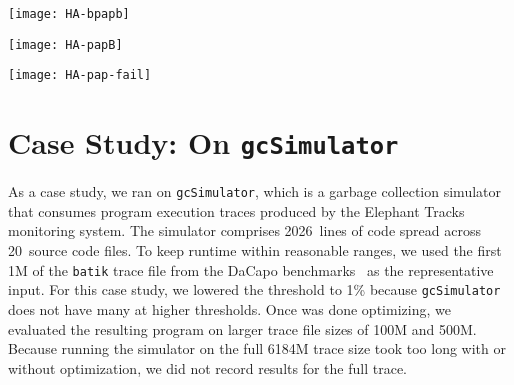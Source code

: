 \begin{figure*}
\texttt{[image: HA-bpapb]}
\label{fig:2-bangs-52-HA}
\end{figure*}

\begin{figure*}
\texttt{[image: HA-papB]}
\label{fig:2-ratio-52-HA}
\end{figure*}


\begin{figure*}
\texttt{[image: HA-pap-fail]}
\label{fig:2-failures-HA}
\end{figure*}


\section{Case Study: \At{} On \texttt{gcSimulator}}
As a case study, we ran \At{} on \texttt{gcSimulator}, which is a
garbage collection simulator that consumes program execution traces
produced by the Elephant Tracks~\cite{Ricci13} monitoring system.  The
simulator comprises 2026~lines of code spread across 20~source code
files. To keep \Ao{} runtime within reasonable ranges, we used the
first 1M of the \texttt{batik} trace file from the DaCapo
benchmarks~\cite{Blackburn06} as the representative input.  For this
case study, we lowered the \absim{} threshold to 1\%
because \texttt{gcSimulator} does not have many \hotspots{} at higher
thresholds.  Once \At{} was done optimizing, we evaluated the
resulting program on larger trace file sizes of 100M and 500M. Because
running the simulator on the full 6184M trace size took too
long with or without optimization, we did not record results for the
full trace.


